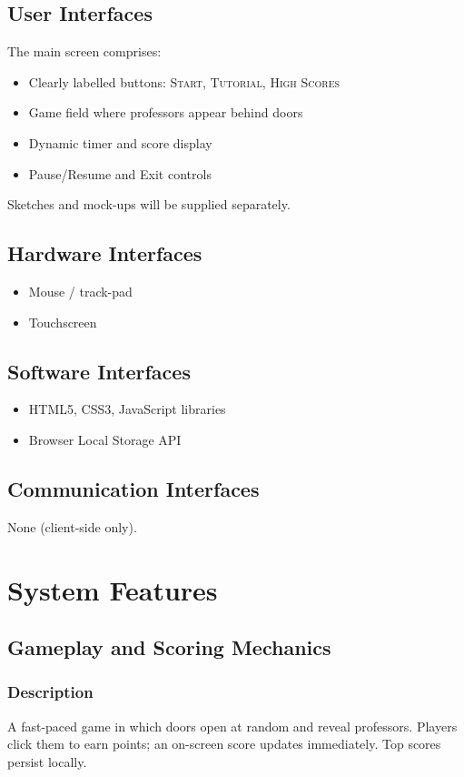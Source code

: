 \documentclass[11pt]{scrreprt}
\begin{document}
\section{User Interfaces}
The main screen comprises:
\begin{itemize}
  \item Clearly labelled buttons: \textsc{Start}, \textsc{Tutorial}, \textsc{High Scores}
  \item Game field where professors appear behind doors
  \item Dynamic timer and score display
  \item Pause/Resume and Exit controls
\end{itemize}
Sketches and mock-ups will be supplied separately.

\section{Hardware Interfaces}
\begin{itemize}
  \item Mouse / track-pad
  \item Touchscreen
\end{itemize}

\section{Software Interfaces}
\begin{itemize}
  \item HTML5, CSS3, JavaScript libraries
  \item Browser Local Storage API
\end{itemize}

\section{Communication Interfaces}
None (client-side only).

\chapter{System Features}

\section{Gameplay and Scoring Mechanics}

\subsection{Description}
A fast-paced game in which doors open at random and reveal professors. Players click them to earn points; an on-screen score updates immediately. Top scores persist locally.
\end{document}
